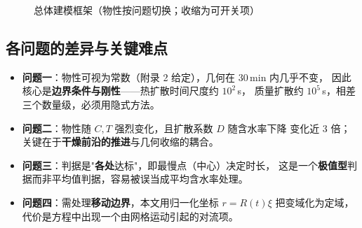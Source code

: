 \documentclass[withoutpreface,bwprint]{cumcmthesis}
\begin{document}
\begin{figure}[htbp]
  \centering
  \caption{总体建模框架（物性按问题切换；收缩为可开关项）}
  \label{fig:framework}
\end{figure}

\subsection{各问题的差异与关键难点}
\begin{itemize}
  \item \textbf{问题一}：物性可视为常数（附录 2 给定），几何在 30\,min 内几乎不变，
        因此核心是\textbf{边界条件与刚性}——热扩散时间尺度约 $10^2$\,s，
        质量扩散约 $10^5$\,s，相差三个数量级，必须用隐式方法。
  \item \textbf{问题二}：物性随 $C,T$ 强烈变化，且扩散系数 $D$ 随含水率下降
        变化近 3 倍；关键在于\textbf{干燥前沿的推进}与几何收缩的耦合。
  \item \textbf{问题三}：判据是"\textbf{各处}达标"，即最慢点（中心）决定时长，
        这是一个\textbf{极值型}判据而非平均值判据，容易被误当成平均含水率处理。
  \item \textbf{问题四}：需处理\textbf{移动边界}，本文用归一化坐标 $r=R(t)\xi$
        把变域化为定域，代价是方程中出现一个由网格运动引起的对流项。
\end{itemize}
\end{document}

